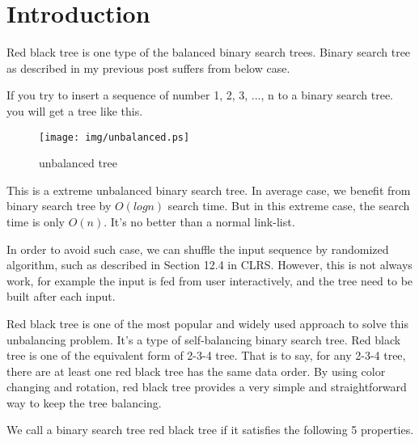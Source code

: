 \documentclass{article}
\begin{document}

\maketitle

\section{Introduction}
\label{introduction}

Red black tree is one type of the balanced binary search trees. Binary search tree as described
in my previous post\cite{bst-lxy} suffers from below case.

If you try to insert a sequence of number 1, 2, 3, ..., n to a binary search tree. you will get a tree like this.

\begin{figure}[htbp]
       \begin{center}
	\texttt{[image: img/unbalanced.ps]}
        \caption{unbalanced tree} \label{fig:unbalanced-tree}
       \end{center}
\end{figure}

This is a extreme unbalanced binary search tree. In average case, we benefit from binary search tree by $O(log n)$ search time. But in this extreme case, the search time is only $O(n)$. It's no better than a normal link-list.

In order to avoid such case, we can shuffle the input sequence by randomized algorithm, such as described in Section 12.4 in CLRS\cite{CLRS}. However, this is not always work, for example the input is fed from user interactively, and the tree need to be built after each input.

Red black tree is one of the most popular and widely used approach to solve this unbalancing problem. It's a type of self-balancing binary search tree\cite{wiki}. Red black tree is one of the equivalent form of 2-3-4 tree. That is to say, for any 2-3-4 tree, there are at least one red black tree has the same data order. By using color changing and rotation, red black tree provides a very simple and straightforward way to keep the tree balancing.

We call a binary search tree red black tree if it satisfies the following 5 properties\cite{CLRS}.
\end{document}
